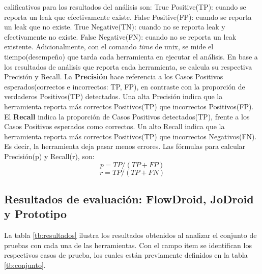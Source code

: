 calificativos para los resultados del análisis son:  
True Positive(TP): cuando se reporta un leak que efectivamente existe. 
False Positive(FP): cuando se reporta un leak que no existe.  
True Negative(TN): cuando no se reporta leak y efectivamente no existe. 
False Negative(FN): cuando no se reporta un leak existente.\newline
Adicionalmente, con el comando \textit{time}\cite{time-man} de unix, se mide el
tiempo(desempeño) que tarda cada herramienta en ejecutar el análisis.\newline
En base a los resultados de análisis que reporta cada herramienta, se
calcula su respectiva Precisión y Recall.\newline
La \textbf{Precisión} hace referencia a los Casos Positivos esperados(correctos
e incorrectos: TP, FP), en contraste con la proporción de verdaderos Positivos(TP)
detectados\cite{Precision-Recall}. Una alta Precisión indica que la herramienta
reporta más correctos Positivos(TP) que incorrectos Positivos(FP).\newline 
El \textbf{Recall} indica la proporción de Casos Positivos detectados(TP),
frente a los Casos Positivos esperados como correctos\cite{Precision-Recall}. Un
alto Recall indica que la herramienta reporta más correctos Positivos(TP) que incorrectos
Negativos(FN). Es decir, la herramienta deja pasar menos errores.\newline
Las fórmulas para calcular Precisión(p) y Recall(r), son:
\begin{equation}
\label{pre}
	p = TP/(TP +FP) 
\end{equation}
\begin{equation}
\label{rec}
	r = TP/(TP+FN)
\end{equation}

\subsection{Resultados de evaluación: FlowDroid, JoDroid y Prototipo}
La tabla \ref{tb:resultados} ilustra los resultados obtenidos al analizar el
conjunto de pruebas con cada una de las herramientas. Con el campo item se
identifican los respectivos casos de prueba, los cuales están
previamente definidos en la tabla \ref{tb:conjunto}.

